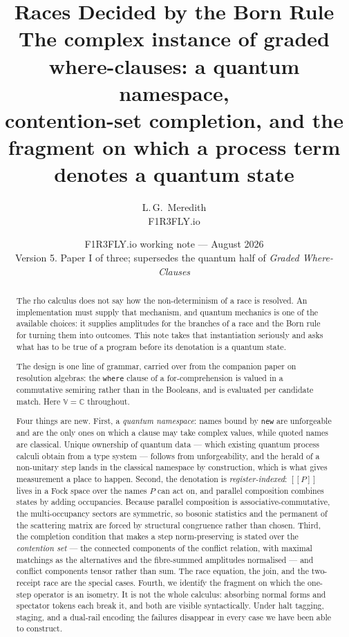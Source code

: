 \documentclass[11pt,a4paper]{article}
\title{\bfseries Races Decided by the Born Rule\\[4pt]
\large The complex instance of graded where-clauses: a quantum namespace,\\
contention-set completion, and the fragment on which a process term\\
denotes a quantum state}
\author{L.\,G.\ Meredith\\ \small F1R3FLY.io}
\date{F1R3FLY.io working note --- August 2026\\[2pt]
\normalsize Version 5. Paper I of three; supersedes the quantum half of
\emph{Graded Where-Clauses}}
\theoremstyle{plain}
\theoremstyle{definition}
\theoremstyle{remark}
\newcommand{\sem}[1]{[\![#1]\!]}
\newcommand{\V}{\mathbb{V}}
\newcommand{\Cx}{\mathbb{C}}
\begin{document}
\maketitle

\begin{abstract}
The rho calculus does not say how the non-determinism of a race is resolved. An
implementation must supply that mechanism, and quantum mechanics is one of the
available choices: it supplies amplitudes for the branches of a race and the
Born rule for turning them into outcomes. This note takes that instantiation
seriously and asks what has to be true of a program before its denotation is a
quantum state.

The design is one line of grammar, carried over from the companion paper on
resolution algebras: the \texttt{where} clause of a for-comprehension is valued
in a commutative semiring rather than in the Booleans, and is evaluated per
candidate match. Here $\V = \Cx$ throughout.

Four things are new. First, a \emph{quantum namespace}: names bound by
\texttt{new} are unforgeable and are the only ones on which a clause may take
complex values, while quoted names are classical. Unique ownership of quantum
data --- which existing quantum process calculi obtain from a type system ---
follows from unforgeability, and the herald of a non-unitary step lands in the
classical namespace by construction, which is what gives measurement a place to
happen. Second, the denotation is \emph{register-indexed}: $\sem{P}$ lives in a
Fock space over the names $P$ can act on, and parallel composition combines
states by adding occupancies. Because parallel composition is
associative-commutative, the multi-occupancy sectors are symmetric, so bosonic
statistics and the permanent of the scattering matrix are forced by structural
congruence rather than chosen. Third, the completion condition that makes a step
norm-preserving is stated over the \emph{contention set} --- the connected
components of the conflict relation, with maximal matchings as the alternatives
and the fibre-summed amplitudes normalised --- and conflict components tensor
rather than sum. The race equation, the join, and the two-receipt race are the
special cases. Fourth, we identify the fragment on which the one-step operator
is an isometry. It is not the whole calculus: absorbing normal forms and
spectator tokens each break it, and both are visible syntactically. Under halt
tagging, staging, and a dual-rail encoding the failures disappear in every case
we have been able to construct.


\end{abstract}
\end{document}
